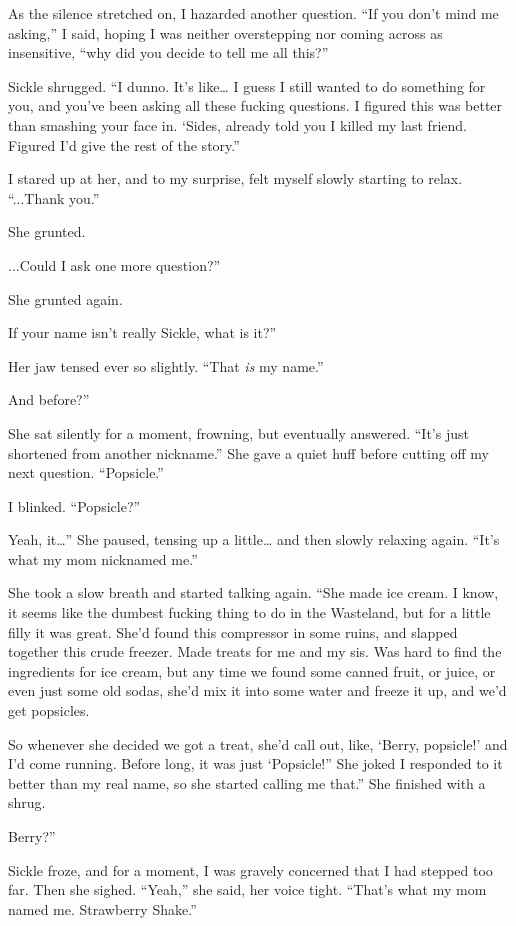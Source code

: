 As the silence stretched on, I hazarded another question. “If you don’t mind me asking,” I said, hoping I was neither overstepping nor coming across as insensitive, “why did you decide to tell me all this?”

Sickle shrugged. “I dunno. It’s like… I guess I still wanted to do something for you, and you’ve been asking all these fucking questions. I figured this was better than smashing your face in. ‘Sides, already told you I killed my last friend. Figured I’d give the rest of the story.”

I stared up at her, and to my surprise, felt myself slowly starting to relax. “...Thank you.”

She grunted.

\leavevmode{}...Could I ask one more question?”

She grunted again.

\leavevmode{}If your name isn’t really Sickle, what is it?”

Her jaw tensed ever so slightly. “That \textit{is} my name.”

\leavevmode{}And before?”

She sat silently for a moment, frowning, but eventually answered. “It’s just shortened from another nickname.” She gave a quiet huff before cutting off my next question. “Popsicle.”

I blinked. “Popsicle?”

\leavevmode{}Yeah, it…” She paused, tensing up a little… and then slowly relaxing again. “It’s what my mom nicknamed me.”

She took a slow breath and started talking again. “She made ice cream. I know, it seems like the dumbest fucking thing to do in the Wasteland, but for a little filly it was great. She’d found this compressor in some ruins, and slapped together this crude freezer. Made treats for me and my sis. Was hard to find the ingredients for ice cream, but any time we found some canned fruit, or juice, or even just some old sodas, she’d mix it into some water and freeze it up, and we’d get popsicles.

\leavevmode{}So whenever she decided we got a treat, she’d call out, like, ‘Berry, popsicle!’ and I’d come running. Before long, it was just ‘Popsicle!” She joked I responded to it better than my real name, so she started calling me that.” She finished with a shrug.

\leavevmode{}Berry?”

Sickle froze, and for a moment, I was gravely concerned that I had stepped too far. Then she sighed. “Yeah,” she said, her voice tight. “That’s what my mom named me. Strawberry Shake.”

